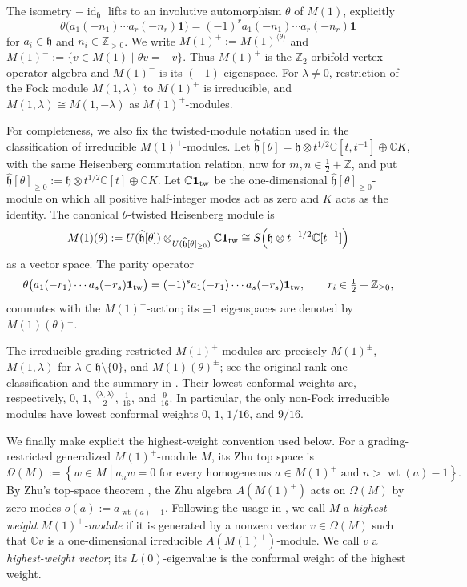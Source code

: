 \documentclass[12pt,leqno]{amsart}
\numberwithin{equation}{section} \newtheorem{thm}{Theorem}[section] \newtheorem{lem}[thm]{Lemma} \newtheorem{ex}[thm]{Example} \newtheorem{prop}[thm]{Proposition} \newtheorem{cor}[thm]{Corollary} \newtheorem{defi}[thm]{Definition} \newtheorem{rmk}[thm]{Remark} \newtheorem{notation}[thm]{Notation}
\newcommand{\one}{\mathbf{1}}
\newcommand{\id}{\operatorname{id}}
\newcommand{\wt}{\operatorname{wt}}
\def\Z{\mathbb{Z}} \def\N{\mathbb{N}} \def\A{\mathbb{A}} \def\C{\mathbb{C}} \def\R{\mathbb{R}} \def\Q{\mathbb{Q}} \def\F{\mathbb{F}}
\begin{document}
The isometry $-\id_{\mathfrak h}$ lifts to an involutive automorphism $\theta$ of $M(1)$, explicitly
\[
\theta\bigl(a_1(-n_1)\cdots a_r(-n_r)\one\bigr)=(-1)^r a_1(-n_1)\cdots a_r(-n_r)\one
\]
for $a_i\in\mathfrak h$ and $n_i\in\Z_{>0}$. We write \(M(1)^+:=M(1)^{\langle\theta\rangle}\) and \(M(1)^-:=\{v\in M(1)\mid\theta v=-v\}\). Thus $M(1)^+$ is the $\mathbb Z_2$-orbifold vertex operator algebra and $M(1)^-$ is its $(-1)$-eigenspace. For $\lambda\ne0$, restriction of the Fock module $M(1,\lambda)$ to $M(1)^+$ is irreducible, and $M(1,\lambda)\cong M(1,-\lambda)$ as $M(1)^+$-modules.

For completeness, we also fix the twisted-module notation used in the classification of irreducible $M(1)^+$-modules. Let \(\widehat{\mathfrak h}[\theta]=\mathfrak h\otimes t^{1/2}\C[t,t^{-1}]\oplus\C K\), with the same Heisenberg commutation relation, now for $m,n\in\frac12+\Z$, and put $\widehat{\mathfrak h}[\theta]_{\ge0} :=\mathfrak h\otimes t^{1/2}\C[t]\oplus\C K$. Let $\C\one_{\rm tw}$ be the one-dimensional $\widehat{\mathfrak h}[\theta]_{\ge0}$-module on which all positive half-integer modes act as zero and $K$ acts as the identity. The canonical $\theta$-twisted Heisenberg module is
\[
M(1)(\theta)
:=
U(\widehat{\mathfrak h}[\theta])
\otimes_{U(\widehat{\mathfrak h}[\theta]_{\ge0})}
\C\one_{\rm tw}
\cong
S\!\left(\mathfrak h\otimes t^{-1/2}\C[t^{-1}]\right)
\]
as a vector space. The parity operator
\[
\theta\bigl(a_1(-r_1)\cdots a_s(-r_s)\one_{\rm tw}\bigr)
=
(-1)^s a_1(-r_1)\cdots a_s(-r_s)\one_{\rm tw},
\qquad r_i\in\tfrac12+\Z_{\ge0},
\]
commutes with the $M(1)^+$-action; its $\pm1$ eigenspaces are denoted by $M(1)(\theta)^\pm$.

The irreducible grading-restricted $M(1)^+$-modules are precisely \(M(1)^\pm\), \(M(1,\lambda)\) for \(\lambda\in\mathfrak h\setminus\{0\}\), and \(M(1)(\theta)^\pm\); see the original rank-one classification \cite{DongNagatomo} and the summary in \cite[Section~2.1]{ALY}. Their lowest conformal weights are, respectively, \(0\), \(1\), \(\frac{\langle\lambda,\lambda\rangle}{2}\), \(\frac1{16}\), and \(\frac9{16}\). In particular, the only non-Fock irreducible modules have lowest conformal weights $0$, $1$, $1/16$, and $9/16$.

We finally make explicit the highest-weight convention used below. For a grading-restricted generalized $M(1)^+$-module $M$, its Zhu top space is
\[
\Omega(M):=\left\{w\in M\middle|a_nw=0\text{ for every homogeneous }a\in M(1)^+\text{ and }n>\wt(a)-1\right\}.
\] By Zhu's top-space theorem \cite{Zhu}, the Zhu algebra $A(M(1)^+)$ acts on $\Omega(M)$ by zero modes $o(a):=a_{\wt(a)-1}$. Following the usage in \cite[Section~3.4]{ALY}, we call $M$ a \emph{highest-weight $M(1)^+$-module} if it is generated by a nonzero vector $v\in\Omega(M)$ such that $\C v$ is a one-dimensional irreducible $A(M(1)^+)$-module. We call $v$ a \emph{highest-weight vector}; its $L(0)$-eigenvalue is the conformal weight of the highest weight.
\end{document}
